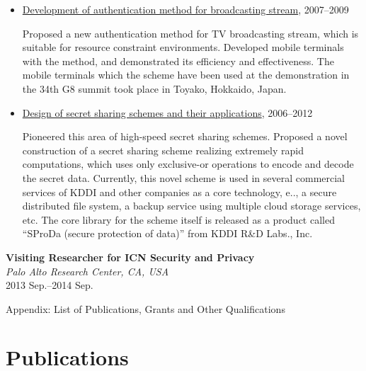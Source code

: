 \begin{itemize}
\item \hspace*{4ex}
\underline{Development of authentication method for broadcasting stream},
2007--2009\\[0.5ex]
\hspace*{6ex}
\begin{minipage}{0.9\linewidth}
Proposed a new authentication method for TV broadcasting stream, which is suitable for
resource constraint environments. Developed mobile terminals with the
 method, and demonstrated its efficiency and effectiveness.
The mobile terminals which the scheme have been used at the
 demonstration in the 34th G8 summit took place in Toyako, Hokkaido, Japan.
\end{minipage}

\item \hspace*{4ex}
\underline{Design of secret sharing schemes and their applications},
2006--2012\\[0.5ex]
\hspace*{6ex}
\begin{minipage}{0.9\linewidth}
Pioneered this area of high-speed secret sharing schemes. Proposed a
 novel construction of a secret sharing scheme realizing extremely rapid
 computations, which uses only exclusive-or operations to encode and
 decode the secret data.
Currently, this novel scheme is used in several commercial services of
 KDDI and other companies as a core technology,
 e.\@g.\@, a secure distributed file system, a backup
 service using multiple cloud storage services, etc.
The core library for the scheme itself is released as a product called ``SProDa (secure protection of data)'' from KDDI R\&D Labs., Inc.
\end{minipage}
\end{itemize}

\textbf{Visiting Researcher for ICN Security and Privacy}\\
\hspace*{4ex}\textit{Palo Alto Research Center, CA, USA}\\
\hspace*{4ex} 2013 Sep.--2014 Sep.



\newpage
\begin{center}
\Large
Appendix: List of Publications, Grants and Other Qualifications
\end{center}

\section*{Publications}

